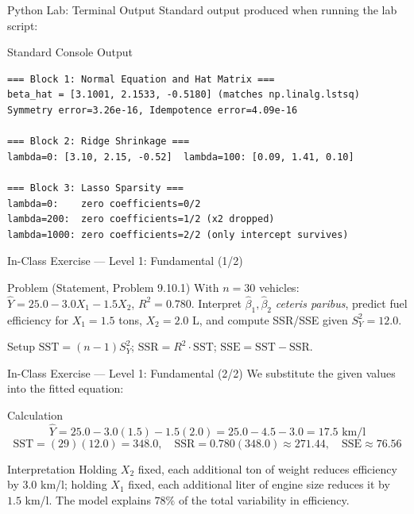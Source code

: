 \documentclass[10pt, aspectratio=169]{beamer}
\begin{document}
\begin{frame}[fragile]{Python Lab: Terminal Output}
  \scriptsize
  Standard output produced when running the lab script:
  \vspace{0.02cm}
  \begin{block}{Standard Console Output}
    \fontsize{3.6pt}{4.3pt}\selectfont
    \begin{verbatim}
=== Block 1: Normal Equation and Hat Matrix ===
beta_hat = [3.1001, 2.1533, -0.5180] (matches np.linalg.lstsq)
Symmetry error=3.26e-16, Idempotence error=4.09e-16

=== Block 2: Ridge Shrinkage ===
lambda=0: [3.10, 2.15, -0.52]  lambda=100: [0.09, 1.41, 0.10]

=== Block 3: Lasso Sparsity ===
lambda=0:    zero coefficients=0/2
lambda=200:  zero coefficients=1/2 (x2 dropped)
lambda=1000: zero coefficients=2/2 (only intercept survives)
    \end{verbatim}
  \end{block}
\end{frame}

\begin{frame}{In-Class Exercise --- Level 1: Fundamental (1/2)}
  \footnotesize
  \begin{block}{Problem (Statement, Problem 9.10.1)}
    With $n=30$ vehicles: $\hat Y=25.0-3.0X_1-1.5X_2$, $R^2=0.780$. Interpret $\hat\beta_1,\hat\beta_2$ \emph{ceteris paribus}, predict fuel efficiency for $X_1=1.5$ tons, $X_2=2.0$ L, and compute SSR/SSE given $S_Y^2=12.0$.
  \end{block}

  \vspace{0.15cm}
  \pause
  \begin{alertblock}{Setup}
    $\text{SST}=(n-1)S_Y^2$; $\text{SSR}=R^2\cdot\text{SST}$; $\text{SSE}=\text{SST}-\text{SSR}$.
  \end{alertblock}
\end{frame}

\begin{frame}{In-Class Exercise --- Level 1: Fundamental (2/2)}
  \scriptsize
  We substitute the given values into the fitted equation: \pause

  \vspace{0.05cm}
  \begin{block}{Calculation}
    $$\hat Y=25.0-3.0(1.5)-1.5(2.0)=25.0-4.5-3.0=17.5 \text{ km/l}$$
    $$\text{SST}=(29)(12.0)=348.0, \quad \text{SSR}=0.780(348.0)\approx271.44, \quad \text{SSE}\approx76.56$$
  \end{block}

  \vspace{0.05cm}
  \pause
  \begin{alertblock}{Interpretation}
    Holding $X_2$ fixed, each additional ton of weight reduces efficiency by $3.0$ km/l; holding $X_1$ fixed, each additional liter of engine size reduces it by $1.5$ km/l. The model explains $78\%$ of the total variability in efficiency.
  \end{alertblock}
\end{frame}
\end{document}
